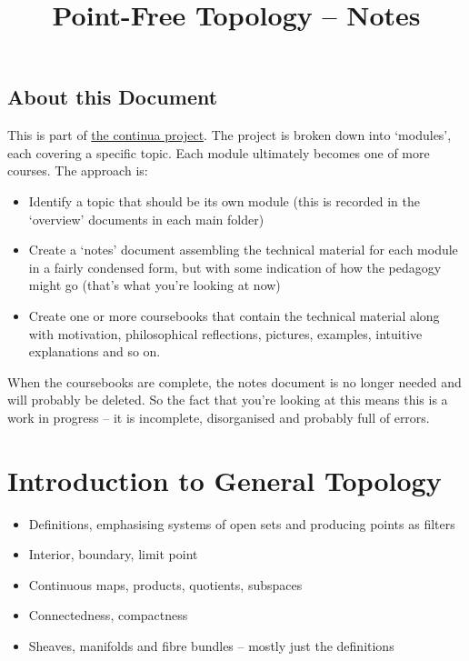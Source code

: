 \documentclass[oneside,english]{amsbook}
\numberwithin{section}{chapter}
\theoremstyle{plain}
\theoremstyle{definition}
\begin{document}
\title{Point-Free Topology -- Notes}

\maketitle

\tableofcontents

\chapter*{About this Document}

This is part of \href{https://github.com/FineArtMaths/continua}{the continua project}. The project is broken down into `modules', each covering a specific topic. Each module ultimately becomes one of more courses. The approach is:

\begin{itemize}
	\item{Identify a topic that should be its own module (this is recorded in the `overview' documents in each main folder)}
	\item{Create a `notes' document assembling the technical material for each module in a fairly condensed form, but with some indication of how the pedagogy might go (that's what you're looking at now)}
	\item{Create one or more coursebooks that contain the technical material along with motivation, philosophical reflections, pictures, examples, intuitive explanations and so on.}
\end{itemize}

When the coursebooks are complete, the notes document is no longer needed and will probably be deleted. So the fact that you're looking at this means this is a work in progress -- it is incomplete, disorganised and probably full of errors.

\part{Introduction to General Topology}

\begin{itemize}
	\item{Definitions, emphasising systems of open sets and producing points as filters}
	\item{Interior, boundary, limit point}
	\item{Continuous maps, products, quotients, subspaces}
	\item{Connectedness, compactness}
	\item{Sheaves, manifolds and fibre bundles -- mostly just the definitions}
\end{itemize}
\end{document}
